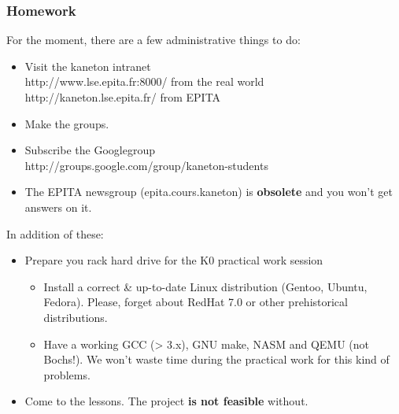 \begin{frame}
  \frametitle{Homework}

  For the moment, there are a few administrative things to do:

  \begin{itemize}
  \item
    Visit the kaneton intranet\\
    http://www.lse.epita.fr:8000/ from the real world\\
    http://kaneton.lse.epita.fr/ from EPITA
  \item
    Make the groups.
  \item
    Subscribe the Googlegroup\\
    http://groups.google.com/group/kaneton-students
  \item
    The EPITA newsgroup (epita.cours.kaneton) is \textbf{obsolete} and
    you won't get answers on it.
  \end{itemize}

  \-

  In addition of these:

  \begin{itemize}
  \item
    Prepare you rack hard drive for the K0 practical work session
    \begin{itemize}
    \item
      Install a correct \& up-to-date Linux distribution (Gentoo, Ubuntu,
      Fedora). Please, forget about RedHat 7.0 or other prehistorical
      distributions.
    \item
      Have a working GCC (> 3.x), GNU make, NASM and QEMU (not Bochs!). We
      won't waste time during the practical work for this kind of
      problems.
    \end{itemize}
  \item
    Come to the lessons. The project \textbf{is not feasible} without.
  \end{itemize}

\end{frame}


